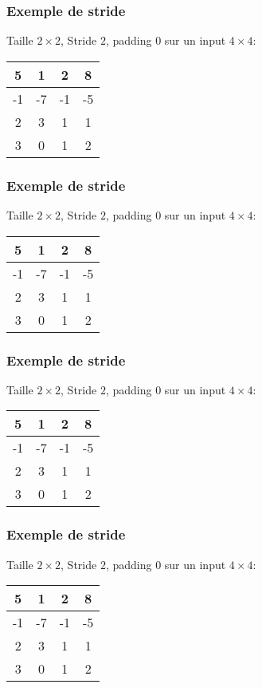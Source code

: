 \documentclass{formation}
\begin{document}
\begin{frame}
  \frametitle{Exemple de stride}
  Taille $2\times 2$, Stride $2$, padding $0$ sur un input $4 \times
  4$:
  \\[.5cm]
  \begin{tabular}{|c|c|c|c|}
    \hline
    \cellcolor{green}5 & \cellcolor{green}1 & 2 & 8 \\
    \hline
    \cellcolor{green}-1 & \cellcolor{green}-7 & -1 & -5 \\
    \hline
    2 & 3 & 1 & 1 \\
    \hline
    3 & 0 & 1 & 2 \\
    \hline
  \end{tabular}

\end{frame}
\begin{frame}
  \frametitle{Exemple de stride}
  Taille $2\times 2$, Stride $2$, padding $0$ sur un input $4 \times
  4$:
  \\[.5cm]
  \begin{tabular}{|c|c|c|c|}
    \hline
    5 & 1 & \cellcolor{green}2 & \cellcolor{green}8 \\
    \hline
    -1 & -7 & \cellcolor{green}-1 & \cellcolor{green}-5 \\
    \hline
    2 & 3 & 1 & 1 \\
    \hline
    3 & 0 & 1 & 2 \\
    \hline
  \end{tabular}

\end{frame}
\begin{frame}
  \frametitle{Exemple de stride}
  Taille $2\times 2$, Stride $2$, padding $0$ sur un input $4 \times
  4$:
  \\[.5cm]
  \begin{tabular}{|c|c|c|c|}
    \hline
    5 & 1 & 2 & 8 \\
    \hline
    -1 & -7 & -1 & -5 \\
    \hline
    \cellcolor{green}2 & \cellcolor{green}3 & 1 & 1 \\
    \hline
    \cellcolor{green}3 & \cellcolor{green}0 & 1 & 2 \\
    \hline
  \end{tabular}

\end{frame}
\begin{frame}
  \frametitle{Exemple de stride}
  Taille $2\times 2$, Stride $2$, padding $0$ sur un input $4 \times
  4$:
  \\[.5cm]
  \begin{tabular}{|c|c|c|c|}
    \hline
    5 & 1 & 2 & 8 \\
    \hline
    -1 & -7 & -1 & -5 \\
    \hline
    2 & 3 & \cellcolor{green}1 & \cellcolor{green}1 \\
    \hline
    3 & 0 & \cellcolor{green}1 & \cellcolor{green}2 \\
    \hline
  \end{tabular}

\end{frame}
\end{document}
